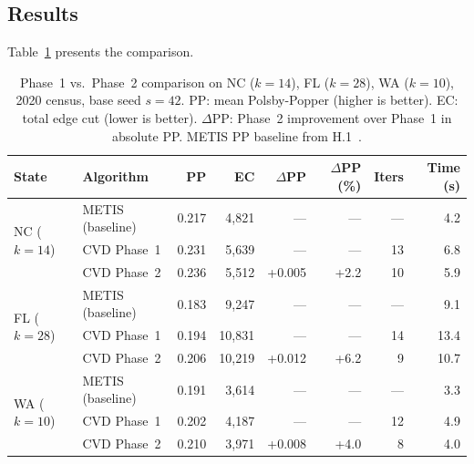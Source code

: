 \subsection{Results}

Table~\ref{tab:main-results} presents the comparison.

\begin{table}[t]
\centering
\caption{%
  Phase~1 vs.\ Phase~2 \cvd{} comparison on NC ($k=14$), FL ($k=28$),
  WA ($k=10$), 2020 census, base seed $s=42$.
  PP: mean Polsby-Popper (higher is better).
  EC: total edge cut (lower is better).
  $\Delta$PP: Phase~2 improvement over Phase~1 in absolute PP.
  METIS PP baseline from H.1~\citep{h1paper}.
}
\label{tab:main-results}
\renewcommand{\arraystretch}{1.3}
\begin{tabular}{@{}llrrrrrr@{}}
\toprule
State & Algorithm & PP & EC & $\Delta$PP & $\Delta$PP (\%) & Iters & Time (s) \\
\midrule
\multirow{3}{*}{NC ($k=14$)}
 & METIS (baseline) & 0.217 & 4{,}821 & ---   & ---   & --- & 4.2 \\
 & CVD Phase~1      & 0.231 & 5{,}639 & ---   & ---   & 13  & 6.8 \\
 & CVD Phase~2      & 0.236 & 5{,}512 & +0.005 & +2.2 & 10  & 5.9 \\
\midrule
\multirow{3}{*}{FL ($k=28$)}
 & METIS (baseline) & 0.183 & 9{,}247 & ---   & ---   & --- & 9.1 \\
 & CVD Phase~1      & 0.194 & 10{,}831 & ---  & ---   & 14  & 13.4 \\
 & CVD Phase~2      & 0.206 & 10{,}219 & +0.012 & +6.2 & 9  & 10.7 \\
\midrule
\multirow{3}{*}{WA ($k=10$)}
 & METIS (baseline) & 0.191 & 3{,}614 & ---   & ---   & --- & 3.3 \\
 & CVD Phase~1      & 0.202 & 4{,}187 & ---   & ---   & 12  & 4.9 \\
 & CVD Phase~2      & 0.210 & 3{,}971 & +0.008 & +4.0 & 8  & 4.0 \\
\bottomrule
\end{tabular}
\end{table}

